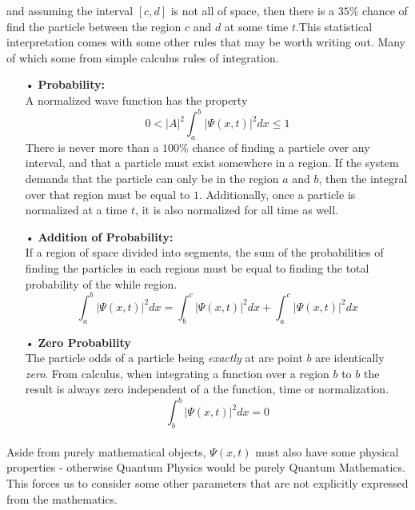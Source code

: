 \documentclass[12pt,letterpaper]{book}
\begin{document}
and assuming the interval $[c,d]$ is not all of space, then there is a $35\%$ chance of find the particle between the region $c$ and $d$ at some time $t$.This statistical interpretation comes with some other rules that may be worth writing out. Many of which some from simple calculus rules of integration.

\begin{enumerate}
\item[•]\textbf{Probability:}\\
A normalized wave function has the property
\begin{equation}
0 < |A|^2 \int_{a}^{b} \big | \Psi(x,t) \big|^2 dx \leq 1
\end{equation}
There is never more than a $100\%$ chance of finding a particle over any interval, and that a particle must exist somewhere in a region. If the system demands that the particle can only be in the region $a$ and $b$, then the integral over that region must be equal to $1$. Additionally, once a particle is normalized at a time $t$, it is also normalized for all time as well.
\item[•]\textbf{Addition of Probability:}\\
If a region of space divided into segments, the sum of the probabilities of finding the particles in each regions must be equal to finding the total probability of the while region.
\begin{equation}
\int_{a}^{b} \big | \Psi(x,t) \big|^2 dx =
\int_{b}^{c} \big | \Psi(x,t) \big|^2 dx +
\int_{a}^{c} \big | \Psi(x,t) \big|^2 dx
\end{equation}
\item[•]\textbf{Zero Probability}\\
The particle odds of a particle being \textit{exactly} at are point $b$ are identically \textit{zero}. From calculus, when integrating a function over a region $b$ to $b$ the result is always zero independent of a the function, time or normalization. 
\begin{equation}
\int_{b}^{b} \big | \Psi(x,t) \big|^2 dx = 0
\end{equation}
\end{enumerate}

\paragraph*{}Aside from purely mathematical objects, $\Psi(x,t)$ must also have some physical properties - otherwise Quantum Physics would be purely Quantum Mathematics. This forces us to consider some other parameters that are not explicitly expressed from the mathematics.
\end{document}
